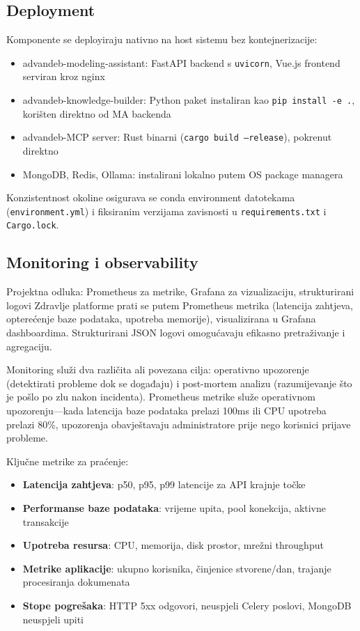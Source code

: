 \documentclass[12pt,a4paper]{article}
\begin{document}
\subsection{Deployment}

Komponente se deployiraju nativno na host sistemu bez kontejnerizacije:

\begin{itemize}
    \item advandeb-modeling-assistant: FastAPI backend s \texttt{uvicorn}, Vue.js frontend serviran kroz nginx
    \item advandeb-knowledge-builder: Python paket instaliran kao \texttt{pip install -e .}, korišten direktno od MA backenda
    \item advandeb-MCP server: Rust binarni (\texttt{cargo build --release}), pokrenut direktno
    \item MongoDB, Redis, Ollama: instalirani lokalno putem OS package managera
\end{itemize}

Konzistentnost okoline osigurava se conda environment datotekama (\texttt{environment.yml}) i fiksiranim verzijama zavisnosti u \texttt{requirements.txt} i \texttt{Cargo.lock}.

\subsection{Monitoring i observability}

\begin{rationale}{Projektna odluka: Prometheus za metrike, Grafana za vizualizaciju, strukturirani logovi}
Zdravlje platforme prati se putem Prometheus metrika (latencija zahtjeva, opterećenje baze podataka, upotreba memorije), visualizirana u Grafana dashboardima. Strukturirani JSON logovi omogućavaju efikasno pretraživanje i agregaciju.
\end{rationale}

Monitoring služi dva različita ali povezana cilja: operativno upozorenje (detektirati probleme dok se događaju) i post-mortem analizu (razumijevanje što je pošlo po zlu nakon incidenta). Prometheus metrike služe operativnom upozorenju—kada latencija baze podataka prelazi 100ms ili CPU upotreba prelazi 80\%, upozorenja obavještavaju administratore prije nego korisnici prijave probleme.

Ključne metrike za praćenje:
\begin{itemize}[leftmargin=*]
    \item \textbf{Latencija zahtjeva}: p50, p95, p99 latencije za API krajnje točke
    \item \textbf{Performanse baze podataka}: vrijeme upita, pool konekcija, aktivne transakcije
    \item \textbf{Upotreba resursa}: CPU, memorija, disk prostor, mrežni throughput
    \item \textbf{Metrike aplikacije}: ukupno korisnika, činjenice stvorene/dan, trajanje procesiranja dokumenata
    \item \textbf{Stope pogrešaka}: HTTP 5xx odgovori, neuspjeli Celery poslovi, MongoDB neuspjeli upiti
\end{itemize}
\end{document}
